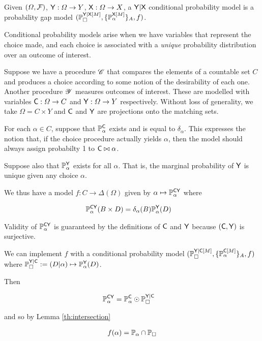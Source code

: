 \begin{definition}
Given $(\Omega,\mathcal{F})$, $\mathsf{Y}:\Omega\to Y$, $\mathsf{X}:\Omega\to X$, a $\mathsf{Y}|\mathsf{X}$ conditional probability model is a probability gap model $(\mathbb{P}_\square^{\mathsf{Y}|\mathsf{X}[M]}, \{\mathbb{P}_{\alpha}^{\mathsf{X}[M]}\}_A,f)$.
\end{definition}

Conditional probability models arise when we have variables that represent the choice made, and each choice is associated with a \emph{unique} probability distribution over an outcome of interest.

\begin{example}
Suppose we have a procedure $\mathscr{C}$ that compares the elements of a countable set $C$ and produces a choice according to some notion of the desirability of each one. Another procedure $\mathscr{Y}$ measures outcomes of interest. These are modelled with variables $\mathsf{C}:\Omega\to C$ and $\mathsf{Y}:\Omega\to Y$ respectively. Without loss of generality, we take $\Omega=C\times Y$ and $\mathsf{C}$ and $\mathsf{Y}$ are projections onto the matching sets.

For each $\alpha\in C$, suppose that $\mathbb{P}_\alpha^{\mathsf{C}}$ exists and is equal to $\delta_{\alpha}$. This expresses the notion that, if the choice procedure actually yields $\alpha$, then the model should always assign probabilty 1 to $\mathsf{C}\bowtie \alpha$.

Suppose also that $\mathbb{P}_\alpha^{\mathsf{Y}}$ exists for all $\alpha$. That is, the marginal probability of $\mathsf{Y}$ is unique given any choice $\alpha$. 

We thus have a model $f:C\to \Delta(\Omega)$ given by $\alpha\mapsto \mathbb{P}_\alpha^{\mathsf{CY}}$ where

\begin{align}
    \mathbb{P}_\alpha^{\mathsf{CY}}(B\times D)&= \delta_\alpha(B)\mathbb{P}_\alpha^{\mathsf{Y}}(D)
\end{align}

Validity of $\mathbb{P}_\alpha^{\mathsf{CY}}$ is guaranteed by the definitions of $\mathsf{C}$ and $\mathsf{Y}$ because $(\mathsf{C},\mathsf{Y})$ is surjective.

We can implement $f$ with a conditional probability model $(\mathbb{P}_\square^{\mathsf{Y}|\mathsf{C}[M]}, \{\mathbb{P}_\alpha^{\mathsf{C}[M]}\}_A,f)$ where $\mathbb{P}_\square^{\mathsf{Y}|\mathsf{C}}:=(D|\alpha)\mapsto \mathbb{P}_\alpha^{\mathsf{Y}}(D)$.

Then

\begin{align}
    \mathbb{P}_\alpha^{\mathsf{CY}} &= \mathbb{P}_\alpha^{\mathsf{C}}\odot \mathbb{P}_\square^{\mathsf{Y}|\mathsf{C}}
\end{align}

and so by Lemma \ref{th:intersection}

\begin{align}
    f(\alpha) = \mathbb{P}_\alpha\cap\mathbb{P}_\square
\end{align}
\end{example}

